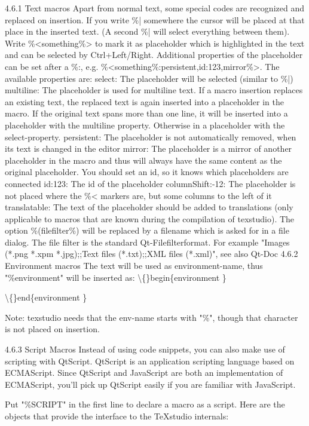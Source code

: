 \documentclass{article}
\begin{document}
	4.6.1 Text macros
	Apart from normal text, some special codes are recognized and replaced on insertion.
	If you write \%| somewhere the cursor will be placed at that place in the inserted text. (A second \%| will select everything between them).
	Write \%<something\%> to mark it as placeholder which is highlighted in the text and can be selected by Ctrl+Left/Right.
	Additional properties of the placeholder can be set after a \%:, e.g. \%<something\%:persistent,id:123,mirror\%>. The available properties are:
	select: The placeholder will be selected (similar to \%|)
	multiline: The placeholder is used for multiline text. If a macro insertion replaces an existing text, the replaced text is again inserted into a placeholder in the macro. If the original text spans more than one line, it will be inserted into a placeholder with the multiline property. Otherwise in a placeholder with the select-property.
	persistent: The placeholder is not automatically removed, when its text is changed in the editor
	mirror: The placeholder is a mirror of another placeholder in the macro and thus will always have the same content as the original placeholder. You should set an id, so it knows which placeholders are connected
	id:123: The id of the placeholder
	columnShift:-12: The placeholder is not placed where the \%< markers are, but some columns to the left of it
	translatable: The text of the placeholder should be added to translations (only applicable to macros that are known during the compilation of texstudio).
	The option \%(filefilter\%) will be replaced by a filename which is asked for in a file dialog. The file filter is the standard Qt-Filefilterformat. For example "Images (*.png *.xpm *.jpg);;Text files (*.txt);;XML files (*.xml)", see also Qt-Doc
	4.6.2 Environment macros
	The text will be used as environment-name, thus "\%environment" will be inserted as:
	\textbackslash\{\}begin\{environment \}
	
	\textbackslash\{\}end\{environment \}
	
	Note: texstudio needs that the env-name starts with "\%", though that character is not placed on insertion.
	
	4.6.3 Script Macros
	Instead of using code snippets, you can also make use of scripting with QtScript. QtScript is an application scripting language based on ECMAScript. Since QtScript and JavaScript are both an implementation of ECMAScript, you'll pick up QtScript easily if you are familiar with JavaScript.
	
	Put "\%SCRIPT" in the first line to declare a macro as a script. Here are the objects that provide the interface to the TeXstudio internals:
	
\end{document}
